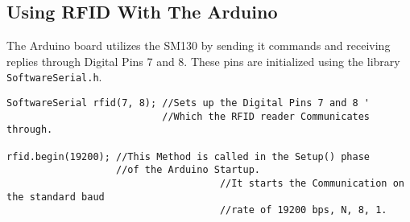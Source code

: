 \subsection{Using RFID With The Arduino}
The Arduino board utilizes the SM130 by sending it commands and receiving replies through Digital Pins 7 and 8.
These pins are initialized using the library \verb|SoftwareSerial.h|.\\
\begin{lstlisting}
SoftwareSerial rfid(7, 8); //Sets up the Digital Pins 7 and 8 '
                           //Which the RFID reader Communicates through.
													
rfid.begin(19200); //This Method is called in the Setup() phase 
                   //of the Arduino Startup.
									 //It starts the Communication on the standard baud
									 //rate of 19200 bps, N, 8, 1.
													
\end{lstlisting}

